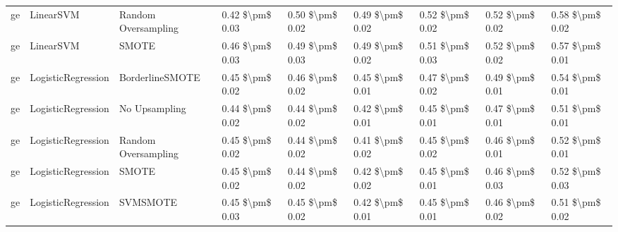 \begin{tabular}{lllllllll}
      ge &                       LinearSVM &           Random Oversampling & 0.42 \$\textbackslash pm\$ 0.03 &           0.50 \$\textbackslash pm\$ 0.02 &       0.49 \$\textbackslash pm\$ 0.02 &        0.52 \$\textbackslash pm\$ 0.02 &                         0.52 \$\textbackslash pm\$ 0.02 &     0.58 \$\textbackslash pm\$ 0.02 \\
      ge &                       LinearSVM &                         SMOTE & 0.46 \$\textbackslash pm\$ 0.03 &           0.49 \$\textbackslash pm\$ 0.03 &       0.49 \$\textbackslash pm\$ 0.02 &        0.51 \$\textbackslash pm\$ 0.03 &                         0.52 \$\textbackslash pm\$ 0.02 &     0.57 \$\textbackslash pm\$ 0.01 \\
      ge &              LogisticRegression &               BorderlineSMOTE & 0.45 \$\textbackslash pm\$ 0.02 &           0.46 \$\textbackslash pm\$ 0.02 &       0.45 \$\textbackslash pm\$ 0.01 &        0.47 \$\textbackslash pm\$ 0.02 &                         0.49 \$\textbackslash pm\$ 0.01 &     0.54 \$\textbackslash pm\$ 0.01 \\
      ge &              LogisticRegression &                 No Upsampling & 0.44 \$\textbackslash pm\$ 0.02 &           0.44 \$\textbackslash pm\$ 0.02 &       0.42 \$\textbackslash pm\$ 0.01 &        0.45 \$\textbackslash pm\$ 0.01 &                         0.47 \$\textbackslash pm\$ 0.01 &     0.51 \$\textbackslash pm\$ 0.01 \\
      ge &              LogisticRegression &           Random Oversampling & 0.45 \$\textbackslash pm\$ 0.02 &           0.44 \$\textbackslash pm\$ 0.02 &       0.41 \$\textbackslash pm\$ 0.02 &        0.45 \$\textbackslash pm\$ 0.02 &                         0.46 \$\textbackslash pm\$ 0.01 &     0.52 \$\textbackslash pm\$ 0.01 \\
      ge &              LogisticRegression &                         SMOTE & 0.45 \$\textbackslash pm\$ 0.02 &           0.44 \$\textbackslash pm\$ 0.02 &       0.42 \$\textbackslash pm\$ 0.02 &        0.45 \$\textbackslash pm\$ 0.01 &                         0.46 \$\textbackslash pm\$ 0.03 &     0.52 \$\textbackslash pm\$ 0.03 \\
      ge &              LogisticRegression &                      SVMSMOTE & 0.45 \$\textbackslash pm\$ 0.03 &           0.45 \$\textbackslash pm\$ 0.02 &       0.42 \$\textbackslash pm\$ 0.01 &        0.45 \$\textbackslash pm\$ 0.01 &                         0.46 \$\textbackslash pm\$ 0.02 &     0.51 \$\textbackslash pm\$ 0.02 \\

\end{tabular}
